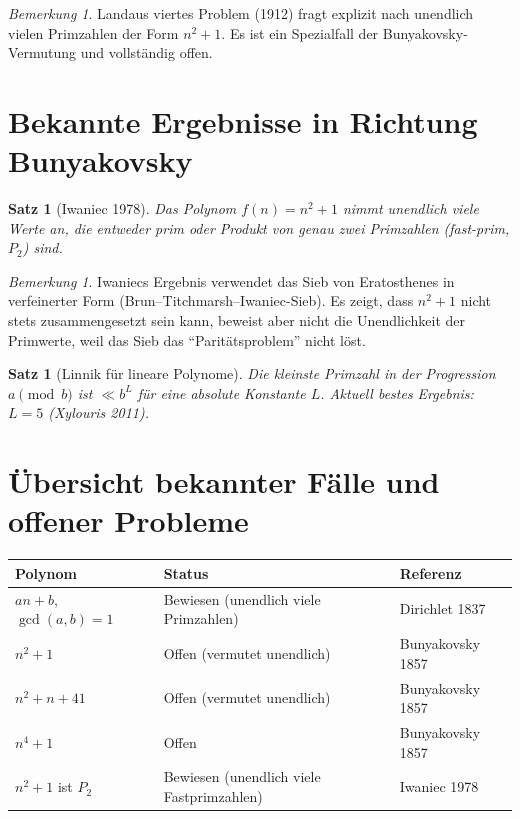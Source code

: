 \documentclass[12pt,a4paper]{amsart}
\newtheorem{satz}[theorem]{Satz}
\theoremstyle{definition}
\theoremstyle{remark}
\newtheorem{bemerkung}[theorem]{Bemerkung}
\begin{document}
\begin{bemerkung}
Landaus viertes Problem (1912) fragt explizit nach unendlich vielen Primzahlen
der Form $n^2 + 1$. Es ist ein Spezialfall der Bunyakovsky-Vermutung und
vollständig offen.
\end{bemerkung}

\section{Bekannte Ergebnisse in Richtung Bunyakovsky}

\begin{satz}[Iwaniec 1978]
Das Polynom $f(n) = n^2 + 1$ nimmt unendlich viele Werte an, die entweder
prim oder Produkt von genau zwei Primzahlen (fast-prim, $P_2$) sind.
\end{satz}

\begin{bemerkung}
Iwaniecs Ergebnis verwendet das Sieb von Eratosthenes in verfeinerter Form
(Brun--Titchmarsh--Iwaniec-Sieb).
Es zeigt, dass $n^2 + 1$ nicht stets zusammengesetzt sein kann, beweist aber
nicht die Unendlichkeit der Primwerte, weil das Sieb das ``Paritätsproblem''
nicht löst.
\end{bemerkung}

\begin{satz}[Linnik für lineare Polynome]
Die kleinste Primzahl in der Progression $a \pmod b$ ist $\ll b^L$
für eine absolute Konstante $L$. Aktuell bestes Ergebnis: $L = 5$
(Xylouris 2011).
\end{satz}

\section{Übersicht bekannter Fälle und offener Probleme}

\begin{center}
\begin{tabular}{lll}
\toprule
Polynom & Status & Referenz \\
\midrule
$an + b$, $\gcd(a,b)=1$ & Bewiesen (unendlich viele Primzahlen) & Dirichlet 1837 \\
$n^2 + 1$ & Offen (vermutet unendlich) & Bunyakovsky 1857 \\
$n^2 + n + 41$ & Offen (vermutet unendlich) & Bunyakovsky 1857 \\
$n^4 + 1$ & Offen & Bunyakovsky 1857 \\
$n^2 + 1$ ist $P_2$ & Bewiesen (unendlich viele Fastprimzahlen) & Iwaniec 1978 \\
\bottomrule
\end{tabular}
\end{center}
\end{document}
